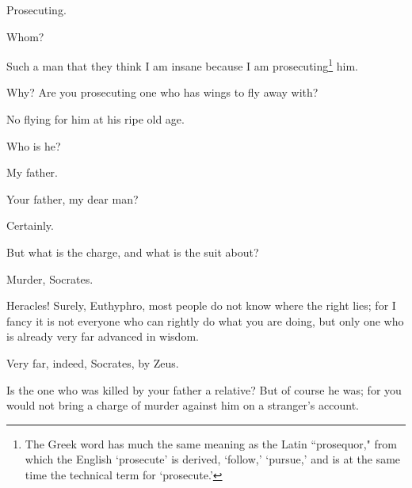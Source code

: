 \documentclass[letterpaper,12pt]{article}
\newcommand{\stephpag}[1]{\marginnote{\small\itshape\fontfamily{ppl}\selectfont #1}}
\begin{document}
\begin{drama}
\euthyphrospeaks
Prosecuting.

\socratesspeaks
Whom? \stephpag{4 a}

\euthyphrospeaks
Such a man that they think I am insane because I am prosecuting\footnote{The Greek word has much the same meaning as the Latin ``prosequor," from which the English `prosecute' is derived, `follow,' `pursue,' and is at the same time the technical term for `prosecute.'} him.

\socratesspeaks
Why? Are you prosecuting one who has wings to fly away with?

\euthyphrospeaks
No flying for him at his ripe old age.

\socratesspeaks
Who is he?

\euthyphrospeaks
My father.

\socratesspeaks
Your father, my dear man?

\euthyphrospeaks
Certainly.

\socratesspeaks
But what is the charge, and what is the suit about?

\euthyphrospeaks
Murder, Socrates.

\socratesspeaks
Heracles! Surely, Euthyphro, most people do not know where the right lies; for I fancy it is not everyone who can rightly do what you are doing, \stephpag{b} but only one who is already very far advanced in wisdom.

\euthyphrospeaks
Very far, indeed, Socrates, by Zeus.

\socratesspeaks
Is the one who was killed by your father a relative? But of course he was; for you would not bring a charge of murder against him on a stranger's account.


\end{drama}
\end{document}
